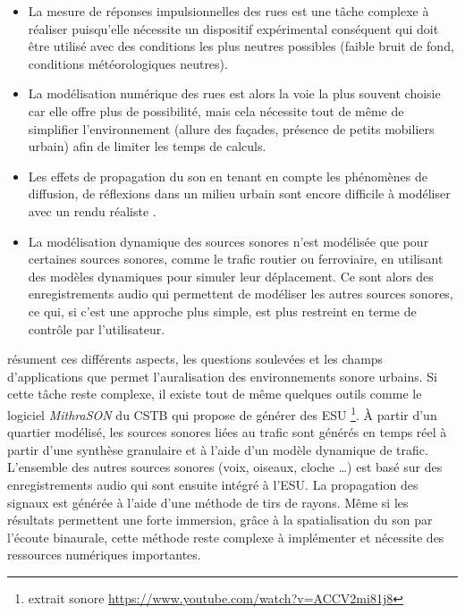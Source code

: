 \begin{itemize}
\item La mesure de réponses impulsionnelles des rues \cite{picaut2005experimental} est une tâche complexe à réaliser puisqu'elle nécessite un dispositif expérimental conséquent qui doit être utilisé avec des conditions les plus neutres possibles (faible bruit de fond, conditions météorologiques neutres).
\item La modélisation numérique des rues est alors la voie la plus souvent choisie car elle offre plus de possibilité, mais cela nécessite tout de même de simplifier l'environnement (allure des façades, présence de petits mobiliers urbain) afin de limiter les temps de calculs.
\item Les effets de propagation du son en tenant en compte les phénomènes de diffusion, de réflexions dans un milieu urbain sont encore difficile à modéliser avec un rendu réaliste \cite{schissler2014high}.
\item La modélisation dynamique des sources sonores n'est modélisée que pour certaines sources sonores, comme le trafic routier ou ferroviaire, en utilisant des modèles dynamiques pour simuler leur déplacement. Ce sont alors des enregistrements audio qui permettent de modéliser les autres sources sonores, ce qui, si c'est une approche plus simple, est plus restreint en terme de contrôle par l'utilisateur. 
\end{itemize}

\cite{stienen2015auralization} résument ces différents aspects, les questions soulevées et les champs d'applications que permet l'auralisation des environnements sonore urbains.
Si cette tâche reste complexe, il existe tout de même quelques outils comme le logiciel \textit{MithraSON} du CSTB qui propose de générer des ESU \footnote{extrait sonore \url{https://www.youtube.com/watch?v=ACCV2mi81j8}}. À partir d'un quartier modélisé, les sources sonores liées au trafic sont générés en temps réel à partir d'une synthèse granulaire et à l'aide d'un modèle dynamique de trafic. L'ensemble des autres sources sonores (voix, oiseaux, cloche \dots) est basé sur des enregistrements audio qui sont ensuite intégré à l'ESU. La propagation des signaux est générée à l'aide d'une méthode de tirs de rayons.
Même si les résultats permettent une forte immersion, grâce à la spatialisation du son par l'écoute binaurale, cette méthode reste complexe à implémenter et nécessite des ressources numériques importantes.

